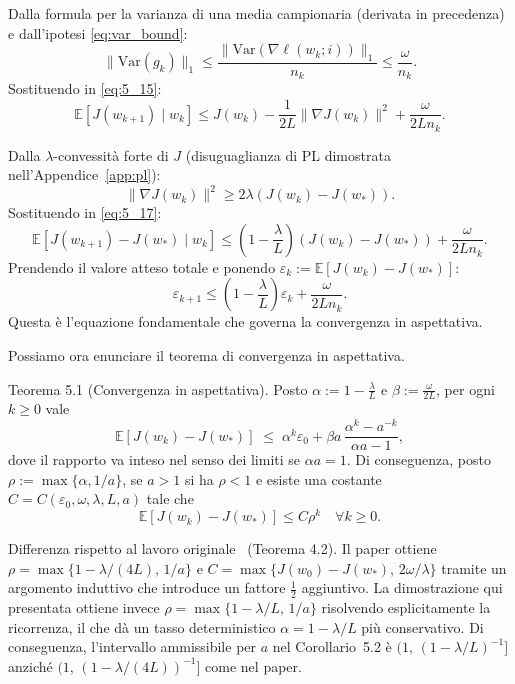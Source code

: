 \documentclass[a4paper,12pt]{article}
\numberwithin{equation}{section}
\numberwithin{figure}{section}
\numberwithin{table}{section}
\begin{document}
Dalla formula per la varianza di una media campionaria (derivata in precedenza) e dall'ipotesi \eqref{eq:var_bound}:
\[
\|\mathrm{Var}(g_k)\|_1 \le \frac{\|\mathrm{Var}(\nabla \ell(w_k;i))\|_1}{n_k} \le \frac{\omega}{n_k}. \tag{5.16}\label{eq:5_16}
\]
Sostituendo in \eqref{eq:5_15}:
\[
\mathbb{E}[J(w_{k+1}) \mid w_k] \le J(w_k) - \frac{1}{2L}\|\nabla J(w_k)\|^2 + \frac{\omega}{2L n_k}. \tag{5.17}\label{eq:5_17}
\]

Dalla \(\lambda\)-convessità forte di \(J\) (disuguaglianza di PL dimostrata nell'Appendice~\ref{app:pl}):
\[
\|\nabla J(w_k)\|^2 \ge 2\lambda (J(w_k) - J(w_*)). \tag{5.18}\label{eq:5_18}
\]
Sostituendo in \eqref{eq:5_17}:
\[
\mathbb{E}[J(w_{k+1}) - J(w_*) \mid w_k] \le \left(1 - \frac{\lambda}{L}\right)(J(w_k) - J(w_*)) + \frac{\omega}{2L n_k}. \tag{5.19}\label{eq:5_19}
\]
Prendendo il valore atteso totale e ponendo \(\varepsilon_k := \mathbb{E}[J(w_k) - J(w_*)]\):
\[
\varepsilon_{k+1} \le \left(1 - \frac{\lambda}{L}\right)\varepsilon_k + \frac{\omega}{2L n_k}. \tag{5.20}\label{eq:5_20}
\]
Questa è l'equazione fondamentale che governa la convergenza in aspettativa.

Possiamo ora enunciare il teorema di convergenza in aspettativa.

\newpage
\begin{thmbox}
Teorema 5.1 (Convergenza in aspettativa).
Posto $\alpha := 1-\frac{\lambda}{L}$ e $\beta := \frac{\omega}{2L}$, per ogni $k\ge 0$ vale
\[
\mathbb{E}[J(w_k)-J(w_*)] \;\le\; \alpha^k\varepsilon_0
+ \beta a\,\frac{\alpha^k-a^{-k}}{\alpha a-1},
\tag{5.21}\label{eq:5_21}
\]
dove il rapporto va inteso nel senso dei limiti se $\alpha a=1$.
Di conseguenza, posto $\rho:=\max\{\alpha,1/a\}$, se $a>1$ si ha $\rho<1$ e
esiste una costante $C=C(\varepsilon_0,\omega,\lambda,L,a)$ tale che
\[
\mathbb{E}[J(w_k)-J(w_*)]\le C\rho^k\quad\forall k\ge0.
\]
\end{thmbox}

\begin{notebox}
  Differenza rispetto al lavoro originale~\cite{byrd2012} (Teorema 4.2).
  Il paper ottiene \(\rho = \max\{1-\lambda/(4L),\,1/a\}\) e \(C = \max\{J(w_0)-J(w_*),\,2\omega/\lambda\}\) tramite un argomento induttivo che introduce un fattore \(\tfrac{1}{2}\) aggiuntivo. La dimostrazione qui presentata ottiene invece \(\rho = \max\{1-\lambda/L,\,1/a\}\) risolvendo esplicitamente la ricorrenza, il che dà un tasso deterministico \(\alpha = 1-\lambda/L\) più conservativo. Di conseguenza, l'intervallo ammissibile per \(a\) nel Corollario~5.2 è \((1,\,(1-\lambda/L)^{-1}]\) anziché \((1,\,(1-\lambda/(4L))^{-1}]\) come nel paper.
\end{notebox}
\end{document}
